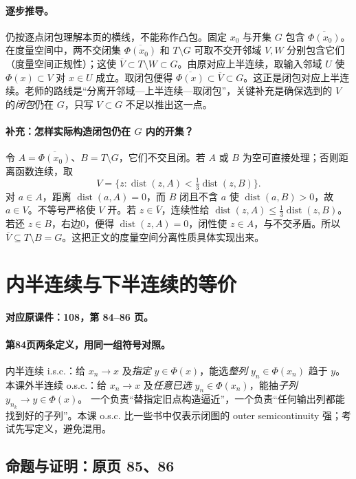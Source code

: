 \documentclass[11pt,a4paper]{article}
\DeclareMathOperator{\dist}{dist}
\theoremstyle{definition}\newtheorem{definition}{定义}\newtheorem{example}{例}
\begin{document}
\paragraph{逐步推导。}仍按逐点闭包理解本页的横线，不能称作凸包。固定 $x_0$ 与开集 $G$ 包含 $\overline{\Phi(x_0)}$。在度量空间中，两不交闭集 $\overline{\Phi(x_0)}$ 和 $T\setminus G$ 可取不交开邻域 $V,W$ 分别包含它们（度量空间正规性）；这使 $\overline V\subset T\setminus W\subset G$。由原对应上半连续，取输入邻域 $U$ 使 $\Phi(x)\subset V$ 对 $x\in U$ 成立。取闭包便得 $\overline{\Phi(x)}\subset\overline V\subset G$。这正是闭包对应上半连续。老师的路线是“分离开邻域—上半连续—取闭包”，关键补充是确保选到的 $V$ 的\emph{闭包}仍在 $G$，只写 $V\subset G$ 不足以推出这一点。


\paragraph{补充：怎样实际构造闭包仍在 $G$ 内的开集？}
令 $A=\overline{\Phi(x_0)}$、$B=T\setminus G$，它们不交且闭。若 $A$ 或 $B$ 为空可直接处理；否则距离函数连续，取
\[V=\{z:\dist(z,A)<\tfrac13\dist(z,B)\}.
\]
对 $a\in A$，距离 $\dist(a,A)=0$，而 $B$ 闭且不含 $a$ 使 $\dist(a,B)>0$，故 $a\in V$。不等号严格使 $V$ 开。若 $z\in\overline V$，连续性给 $\dist(z,A)\le\tfrac13\dist(z,B)$。若还 $z\in B$，右边0，便得 $\dist(z,A)=0$，闭性使 $z\in A$，与不交矛盾。所以 $\overline V\subseteq T\setminus B=G$。这把正文的度量空间分离性质具体实现出来。


\clearpage\section{内半连续与下半连续的等价}\label{g:108:84}

\textbf{对应原课件：108，第 84--86 页。}


\paragraph{第84页两条定义，用同一组符号对照。}
内半连续 i.s.c.：给 $x_n\to x$ 及\emph{指定} $y\in\Phi(x)$，能选\emph{整列} $y_n\in\Phi(x_n)$ 趋于 $y$。
本课外半连续 o.s.c.：给 $x_n\to x$ 及\emph{任意已选} $y_n\in\Phi(x_n)$，能抽\emph{子列} $y_{n_k}\to y\in\Phi(x)$。
一个负责“替指定旧点构造逼近”，一个负责“任何输出列都能找到好的子列”。本课 o.s.c. 比一些书中仅表示闭图的 outer semicontinuity 强；考试先写定义，避免混用。


\subsection{命题与证明：原页 85、86}
\end{document}
